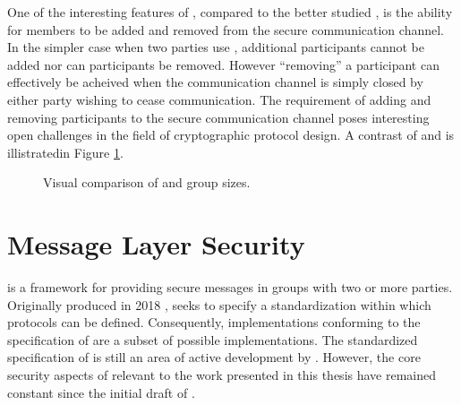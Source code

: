 One of the interesting features of , compared to the better studied , is the ability for members to be added and removed from the secure communication channel.
In the simpler case when two parties use , additional participants cannot be added nor can participants be removed.
However ``removing'' a participant can effectively be acheived when the communication channel is simply closed by either party wishing to cease communication.
The  requirement of adding and removing participants to the secure communication channel poses interesting open challenges in the field of cryptographic protocol design.
A contrast of  and  is illistratedin Figure \ref{fig:Secure-Messaging-And-Secure-Group-Messaging}.

\begin{figure}[ht!]
  \centering
  \caption[Secure Messaging and Secure Group Messaging]{%
  \label{fig:Secure-Messaging-And-Secure-Group-Messaging}%
  Visual comparison of  and  group sizes.
  }%
%
\end{figure}


\hypertarget{sec:message-layer-security}{%
\section{Message Layer Security}\label{sec:message-layer-security}}

 \autocite{Omara2020} is a framework for providing secure messages in groups with two or more parties.
Originally produced in 2018 \autocite{ietf-mls-architecture-02},  seeks to specify a standardization within which  protocols can be defined.
Consequently, implementations conforming to the specification of  are a subset of possible  implementations.
The standardized specification of  is still an area of active development by .
However, the core security aspects of  relevant to the work presented in this thesis have remained constant since the initial draft of .


